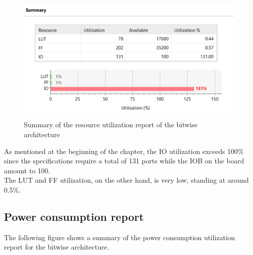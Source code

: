 \begin{figure}[H]
    \begin{center}
        \includegraphics[scale=.75,clip]{img/vivado_bit_resources.png}
    \end{center}
    \vspace*{-0.5cm}
    \caption{Summary of the resource utilization report of the bitwise architecture}
    \label{fig:vivado_bit_resources}
\end{figure}
\hfill \break
As mentioned at the beginning of the chapter, the IO utilization exceeds 100\% since the specifications require a total of 131 ports while the IOB on the board amount to 100.\\
The LUT and FF utilization, on the other hand, is very low, standing at around 0.5\%.

\subsection{Power consumption report}

The following figure shows a summary of the power consumption utilization report for the bitwise architecture.

